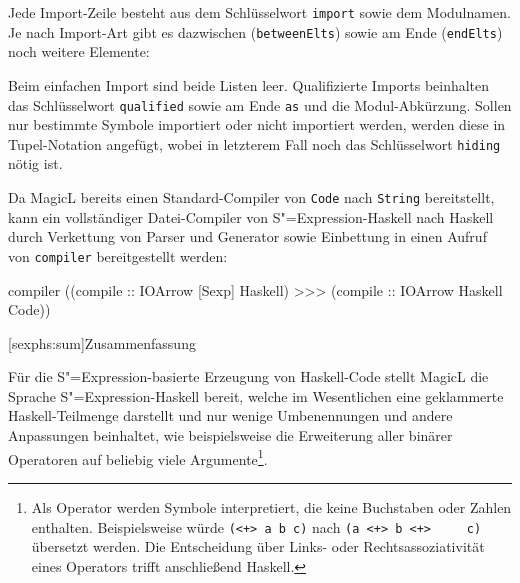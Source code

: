 \documentclass[12pt, a4paper, bibgerm]{scrbook}
\newenvironment{DIFnomarkup}{}{}
\newcommand\icode[1]{\lstinline?#1?}
\newcommand\lsection{}
\newcommand{\sexp}{S"=Expression}
\begin{document}
Jede Import-Zeile besteht aus dem Schlüsselwort \icode{import} sowie
dem Modulnamen. Je nach Import-Art gibt es dazwischen
(\icode{betweenElts}) sowie am Ende (\icode{endElts}) noch
weitere Elemente:
\begin{DIFnomarkup}\end{DIFnomarkup}%
Beim einfachen Import sind beide Listen leer. Qualifizierte Imports
beinhalten das Schlüsselwort \icode{qualified} sowie am Ende
\icode{as} und die Modul-Abkürzung. Sollen nur bestimmte Symbole
importiert oder nicht importiert werden, werden diese in
Tupel-Notation angefügt, wobei in letzterem Fall noch das
Schlüsselwort \icode{hiding} nötig ist.

Da MagicL bereits einen Standard-Compiler von \icode{Code} nach
\icode{String} bereitstellt, kann ein vollständiger Datei-Compiler von
\sexp{}-Haskell nach Haskell durch Verkettung von Parser
und Generator sowie Einbettung in einen Aufruf von \icode{compiler}
bereitgestellt werden:
\begin{DIFnomarkup}\begin{code}
compiler ((compile :: IOArrow [Sexp] Haskell) >>> 
          (compile :: IOArrow Haskell Code))  
\end{code}\end{DIFnomarkup}

\lsection[sexphs:sum]{Zusammenfassung}

Für die \sexp{}-basierte Erzeugung von Haskell-Code stellt MagicL die
Sprache \sexp{}-Haskell bereit, welche im Wesentlichen eine geklammerte
Haskell-Teilmenge darstellt und nur wenige Umbenennungen und andere
Anpassungen beinhaltet, wie beispielsweise die Erweiterung aller binärer
Operatoren auf beliebig viele Argumente\footnote{Als Operator werden
  Symbole interpretiert, die keine Buchstaben oder Zahlen
  enthalten. Beispielsweise würde \icode{(<+> a b c)} nach \icode{(a <+> b <+>
    c)} übersetzt werden. Die Entscheidung über Links- oder
  Rechtsassoziativität eines Operators trifft anschließend Haskell.}.
\end{document}
